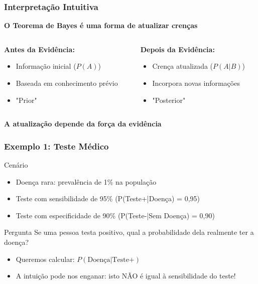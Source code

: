 \documentclass[11pt]{beamer}
\begin{document}
\begin{frame}
\frametitle{Interpretação Intuitiva}
\begin{center}
\textbf{O Teorema de Bayes é uma forma de atualizar crenças}
\end{center}

\begin{columns}
\begin{column}{0.48\textwidth}
\textbf{Antes da Evidência:}
\begin{itemize}
\item Informação inicial ($P(A)$)
\item Baseada em conhecimento prévio
\item "Prior"
\end{itemize}
\end{column}

\begin{column}{0.48\textwidth}
\textbf{Depois da Evidência:}
\begin{itemize}
\item Crença atualizada ($P(A|B)$)
\item Incorpora novas informações
\item "Posterior"
\end{itemize}
\end{column}
\end{columns}

\vspace{0.5cm}
\begin{center}
\textbf{A atualização depende da força da evidência}
\end{center}
\end{frame}

\begin{frame}
\frametitle{Exemplo 1: Teste Médico}
\begin{block}{Cenário}
\begin{itemize}
\item Doença rara: prevalência de 1\% na população
\item Teste com sensibilidade de 95\% (P(Teste+|Doença) = 0,95)
\item Teste com especificidade de 90\% (P(Teste-|Sem Doença) = 0,90)
\end{itemize}
\end{block}

\begin{alertblock}{Pergunta}
Se uma pessoa testa positivo, qual a probabilidade dela realmente ter a doença?
\end{alertblock}

\begin{itemize}
\item Queremos calcular: $P(\text{Doença}|\text{Teste+})$
\item A intuição pode nos enganar: isto NÃO é igual à sensibilidade do teste!
\end{itemize}
\end{frame}
\end{document}
